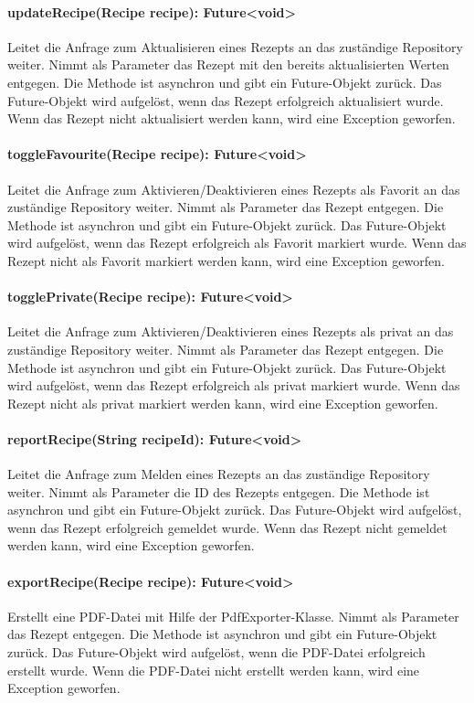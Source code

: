 \documentclass[parskip=full]{scrartcl}
\begin{document}
\paragraph{updateRecipe(Recipe recipe): Future<void>}
Leitet die Anfrage zum Aktualisieren eines Rezepts an das zuständige Repository weiter. Nimmt als Parameter das Rezept mit den bereits aktualisierten Werten entgegen. Die Methode ist asynchron und gibt ein Future-Objekt zurück. Das Future-Objekt wird aufgelöst, wenn das Rezept erfolgreich aktualisiert wurde. Wenn das Rezept nicht aktualisiert werden kann, wird eine Exception geworfen.
\paragraph{toggleFavourite(Recipe recipe): Future<void>}
Leitet die Anfrage zum Aktivieren/Deaktivieren eines Rezepts als Favorit an das zuständige Repository weiter. Nimmt als Parameter das Rezept entgegen. Die Methode ist asynchron und gibt ein Future-Objekt zurück. Das Future-Objekt wird aufgelöst, wenn das Rezept erfolgreich als Favorit markiert wurde. Wenn das Rezept nicht als Favorit markiert werden kann, wird eine Exception geworfen.
\paragraph{togglePrivate(Recipe recipe): Future<void>}
Leitet die Anfrage zum Aktivieren/Deaktivieren eines Rezepts als privat an das zuständige Repository weiter. Nimmt als Parameter das Rezept entgegen. Die Methode ist asynchron und gibt ein Future-Objekt zurück. Das Future-Objekt wird aufgelöst, wenn das Rezept erfolgreich als privat markiert wurde. Wenn das Rezept nicht als privat markiert werden kann, wird eine Exception geworfen.
\paragraph{reportRecipe(String recipeId): Future<void>}
Leitet die Anfrage zum Melden eines Rezepts an das zuständige Repository weiter. Nimmt als Parameter die ID des Rezepts entgegen. Die Methode ist asynchron und gibt ein Future-Objekt zurück. Das Future-Objekt wird aufgelöst, wenn das Rezept erfolgreich gemeldet wurde. Wenn das Rezept nicht gemeldet werden kann, wird eine Exception geworfen.
\paragraph{exportRecipe(Recipe recipe): Future<void>}
Erstellt eine PDF-Datei mit Hilfe der PdfExporter-Klasse. Nimmt als Parameter das Rezept entgegen. Die Methode ist asynchron und gibt ein Future-Objekt zurück. Das Future-Objekt wird aufgelöst, wenn die PDF-Datei erfolgreich erstellt wurde. Wenn die PDF-Datei nicht erstellt werden kann, wird eine Exception geworfen.
\end{document}
